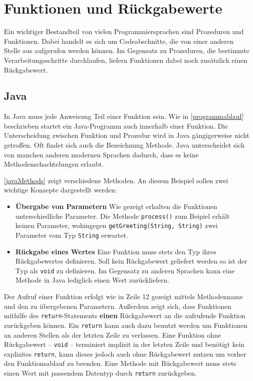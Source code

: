\section{Funktionen und Rückgabewerte}\label{sec:functionsAndReturnValues}
Ein wichtiger Bestandteil von vielen Programmiersprachen sind Prozeduren und Funktionen. Dabei handelt es sich um Codeabschnitte, die von einer anderen Stelle aus aufgerufen werden können. Im Gegensatz zu Prozeduren, die bestimmte Verarbeitungsschritte durchlaufen, liefern Funktionen dabei noch zusätzlich einen Rückgabewert.

\subsection*{Java}
In Java muss jede Anweisung Teil einer Funktion sein. Wie in \autoref{programmablauf} beschrieben startet ein Java-Programm auch innerhalb einer Funktion. Die Unterscheidung zwischen Funktion und Prozedur wird in Java gängigerweise nicht getroffen. Oft findet sich auch die Bezeichnung Methode. Java unterscheidet sich von manchen anderen modernen Sprachen dadurch, dass es keine Methodenschachtelungen erlaubt.

\autoref{javaMethods} zeigt verschiedene Methoden. An diesem Beispiel sollen zwei wichtige Konzepte dargestellt werden: 
\begin{itemize}
    \item \textbf{Übergabe von Parametern}
    Wie gezeigt erhalten die Funktionen unterschiedliche Parameter. Die Methode \texttt{process()} zum Beipiel erhält keinen Parameter, wohingegen \texttt{getGreeting(String, String)} zwei Parameter vom Typ \texttt{String} erwartet.
    \item \textbf{Rückgabe eines Wertes}
    Eine Funktion muss stets den Typ ihres Rückgabewertes definieren. Soll kein Rückgabewert geliefert werden so ist der Typ als \texttt{void} zu definieren. Im Gegensatz zu anderen Sprachen kann eine Methode in Java lediglich einen Wert zurückliefern.
\end{itemize}
Der Aufruf einer Funktion erfolgt wie in Zeile 12 gezeigt mittels Methodenname und den zu übergebenen Parametern. Außerdem zeigt sich, dass Funktionen mithilfe des \texttt{return}-Statements \textbf{einen} Rückgabewert an die aufrufende Funktion zurückgeben können. Ein \texttt{return} kann auch dazu benutzt werden um Funktionen an anderen Stellen als der letzten Zeile zu verlassen. Eine Funktion ohne Rückgabewert -- \texttt{void} -- terminiert implizit in der letzten Zeile und benötigt kein explizites \texttt{return}, kann dieses jedoch auch ohne Rückgabewert nutzen um vorher den Funktionsablauf zu beenden. Eine Methode mit Rückgabewert muss stets einen Wert mit passendem Datentyp durch \texttt{return} zurückgeben.


